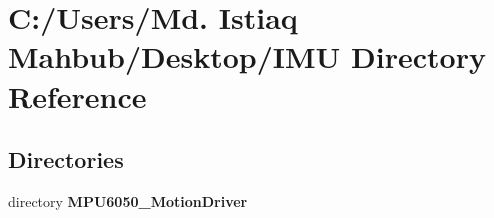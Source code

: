 \section{C\+:/\+Users/\+Md. Istiaq Mahbub/\+Desktop/\+I\+MU Directory Reference}
\label{dir_f8c1e54f909d7baca87c5fa4a81c2213}
\subsection*{Directories}
\begin{DoxyCompactItemize}
\item 
directory \textbf{ M\+P\+U6050\+\_\+\+Motion\+Driver}
\end{DoxyCompactItemize}
